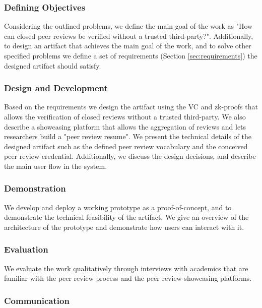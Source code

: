 \subsubsection{Defining Objectives}

Considering the outlined problems, we define the main goal of the work as "How can closed peer reviews be verified without a trusted third-party?". Additionally, to design an artifact that achieves the main goal of the work, and to solve other specified problems we define a set of requirements (Section \ref{sec:requirements}) the designed artifact should satisfy. 

\subsubsection{Design and Development}

Based on the requirements we design the artifact using the \acrlong{VC} and \acrlong{zk-proofs} that allows the verification of closed reviews without a trusted third-party. We also describe a showcasing platform that allows the aggregation of reviews and lets researchers build a "peer review resume". We present the technical details of the designed artifact such as the defined peer review vocabulary and the conceived peer review credential. Additionally, we discuss the design decisions, and describe the main user flow in the system. 

\subsubsection{Demonstration}

We develop and deploy a working prototype as a proof-of-concept, and to demonstrate the technical feasibility of the artifact. We give an overview of the architecture of the prototype and demonstrate how users can interact with it. 

\subsubsection{Evaluation}

We evaluate the work qualitatively through interviews with academics that are familiar with the peer review process and the peer review showcasing platforms.


\subsubsection{Communication}

